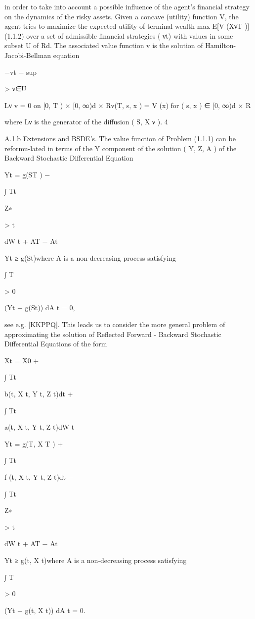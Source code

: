 \documentclass[11pt]{article}
\begin{document}
in order to take into account a possible influence of the agent's financial strategy on the dynamics of the risky assets. Given a concave (utility) function V, the agent tries to maximize the expected utility of terminal wealth max E[V (XνT )] (1.1.2) over a set of admissible financial strategies ( νt) with values in some subset U of Rd. The associated value function v is the solution of Hamilton-Jacobi-Bellman equation

−vt − sup

> ν∈U

Lν v = 0 on [0, T ) × [0, ∞)d × Rv(T, s, x ) = V (x) for ( s, x ) ∈ [0, ∞)d × R

where Lν is the generator of the diffusion ( S, X ν ). 4

A.1.b Extensions and BSDE's. The value function of Problem (1.1.1) can be reformu-lated in terms of the Y component of the solution ( Y, Z, A ) of the Backward Stochastic Differential Equation

Yt = g(ST ) −

∫ Tt

Z∗

> t

dW t + AT − At

Yt ≥ g(St)where A is a non-decreasing process satisfying

∫ T

> 0

(Yt − g(St)) dA t = 0,

see e.g. [KKPPQ]. This leads us to consider the more general problem of approximating the solution of Reflected Forward - Backward Stochastic Differential Equations of the form

Xt = X0 +

∫ Tt

b(t, X t, Y t, Z t)dt +

∫ Tt

a(t, X t, Y t, Z t)dW t

Yt = g(T, X T ) +

∫ Tt

f (t, X t, Y t, Z t)dt −

∫ Tt

Z∗

> t

dW t + AT − At

Yt ≥ g(t, X t)where A is a non-decreasing process satisfying

∫ T

> 0

(Yt − g(t, X t)) dA t = 0.
\end{document}
